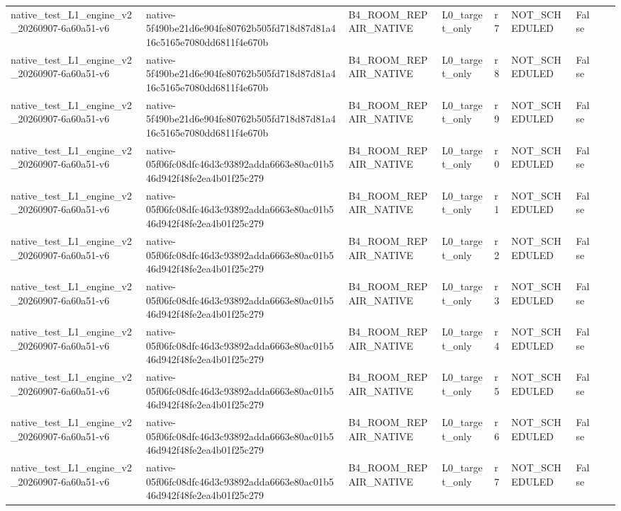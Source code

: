 \begin{tabular}{lllllllll}
native\_test\_L1\_engine\_v2\_20260907-6a60a51-v6 & native-5f490be21d6e904fe80762b505fd718d87d81a416c5165e7080dd6811f4e670b & B4\_ROOM\_REPAIR\_NATIVE & L0\_target\_only & r7 & NOT\_SCHEDULED & False &  &  \\
native\_test\_L1\_engine\_v2\_20260907-6a60a51-v6 & native-5f490be21d6e904fe80762b505fd718d87d81a416c5165e7080dd6811f4e670b & B4\_ROOM\_REPAIR\_NATIVE & L0\_target\_only & r8 & NOT\_SCHEDULED & False &  &  \\
native\_test\_L1\_engine\_v2\_20260907-6a60a51-v6 & native-5f490be21d6e904fe80762b505fd718d87d81a416c5165e7080dd6811f4e670b & B4\_ROOM\_REPAIR\_NATIVE & L0\_target\_only & r9 & NOT\_SCHEDULED & False &  &  \\
native\_test\_L1\_engine\_v2\_20260907-6a60a51-v6 & native-05f06fc08dfc46d3c93892adda6663e80ac01b546d942f48fe2ea4b01f25c279 & B4\_ROOM\_REPAIR\_NATIVE & L0\_target\_only & r0 & NOT\_SCHEDULED & False &  &  \\
native\_test\_L1\_engine\_v2\_20260907-6a60a51-v6 & native-05f06fc08dfc46d3c93892adda6663e80ac01b546d942f48fe2ea4b01f25c279 & B4\_ROOM\_REPAIR\_NATIVE & L0\_target\_only & r1 & NOT\_SCHEDULED & False &  &  \\
native\_test\_L1\_engine\_v2\_20260907-6a60a51-v6 & native-05f06fc08dfc46d3c93892adda6663e80ac01b546d942f48fe2ea4b01f25c279 & B4\_ROOM\_REPAIR\_NATIVE & L0\_target\_only & r2 & NOT\_SCHEDULED & False &  &  \\
native\_test\_L1\_engine\_v2\_20260907-6a60a51-v6 & native-05f06fc08dfc46d3c93892adda6663e80ac01b546d942f48fe2ea4b01f25c279 & B4\_ROOM\_REPAIR\_NATIVE & L0\_target\_only & r3 & NOT\_SCHEDULED & False &  &  \\
native\_test\_L1\_engine\_v2\_20260907-6a60a51-v6 & native-05f06fc08dfc46d3c93892adda6663e80ac01b546d942f48fe2ea4b01f25c279 & B4\_ROOM\_REPAIR\_NATIVE & L0\_target\_only & r4 & NOT\_SCHEDULED & False &  &  \\
native\_test\_L1\_engine\_v2\_20260907-6a60a51-v6 & native-05f06fc08dfc46d3c93892adda6663e80ac01b546d942f48fe2ea4b01f25c279 & B4\_ROOM\_REPAIR\_NATIVE & L0\_target\_only & r5 & NOT\_SCHEDULED & False &  &  \\
native\_test\_L1\_engine\_v2\_20260907-6a60a51-v6 & native-05f06fc08dfc46d3c93892adda6663e80ac01b546d942f48fe2ea4b01f25c279 & B4\_ROOM\_REPAIR\_NATIVE & L0\_target\_only & r6 & NOT\_SCHEDULED & False &  &  \\
native\_test\_L1\_engine\_v2\_20260907-6a60a51-v6 & native-05f06fc08dfc46d3c93892adda6663e80ac01b546d942f48fe2ea4b01f25c279 & B4\_ROOM\_REPAIR\_NATIVE & L0\_target\_only & r7 & NOT\_SCHEDULED & False &  &  \\

\end{tabular}
